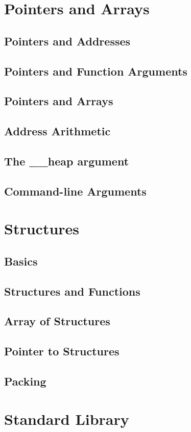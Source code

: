 \documentclass{scrartcl}
\begin{document}
    \section{Pointers and Arrays}
        \subsection{Pointers and Addresses}
        \subsection{Pointers and Function Arguments}
        \subsection{Pointers and Arrays}
        \subsection{Address Arithmetic}
        \subsection{The \_\_heap argument}
        \subsection{Command-line Arguments}
    \section{Structures}
        \subsection{Basics}
        \subsection{Structures and Functions}
        \subsection{Array of Structures}
        \subsection{Pointer to Structures}
        \subsection{Packing}
    \section{Standard Library}
\end{document}
